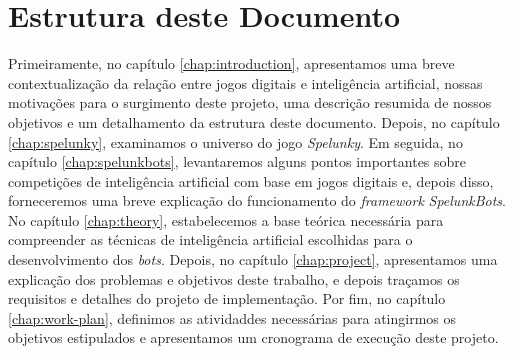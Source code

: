 \chapter{\label{chap:document-structure}Estrutura deste Documento}
Primeiramente, no capítulo \ref{chap:introduction}, apresentamos uma breve
contextualização da relação entre jogos digitais e inteligência artificial,
nossas motivações para o surgimento deste projeto, uma descrição resumida de
nossos objetivos e um detalhamento da estrutura deste documento. Depois, no
capítulo \ref{chap:spelunky}, examinamos o universo do jogo \textit{Spelunky}.
Em seguida, no capítulo \ref{chap:spelunkbots}, levantaremos alguns pontos
importantes sobre competições de inteligência artificial com base em jogos
digitais e, depois disso, forneceremos uma breve explicação do funcionamento do
\textit{framework} \textit{SpelunkBots}. No capítulo \ref{chap:theory},
estabelecemos a base teórica necessária para compreender as técnicas de
inteligência artificial escolhidas para o desenvolvimento dos \textit{bots}.
Depois, no capítulo \ref{chap:project}, apresentamos uma explicação dos
problemas e objetivos deste trabalho, e depois traçamos os requisitos e detalhes
do projeto de implementação. Por fim, no capítulo \ref{chap:work-plan},
definimos as atividaddes necessárias para atingirmos os objetivos estipulados e
apresentamos um cronograma de execução deste projeto.
